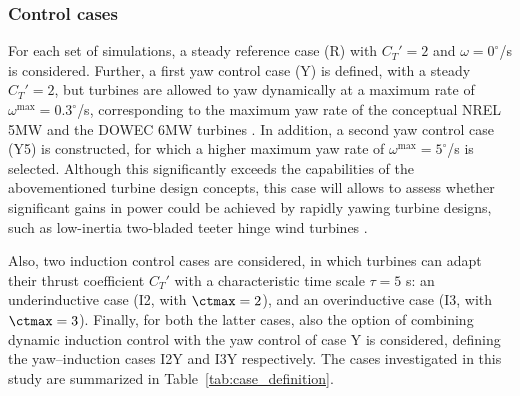 \subsubsection{Control cases}

For each set of simulations, a steady reference case (R) with $C_T' = 2$ and $\omega = 0^\circ$/s is considered. Further, a first yaw control case (Y) is defined, with a steady $C_T'=2$, but turbines are allowed to yaw dynamically at a maximum rate of $\omega^{\text{max}} = 0.3^\circ$/s, corresponding to the maximum yaw rate of the conceptual NREL 5MW and the DOWEC 6MW turbines \citep{jonkman2009definition, kooijman2003dowec}. In addition, a second yaw control case (Y5) is constructed, for which a higher maximum yaw rate of $\omega^{\text{max}} = 5^\circ$/s is selected. Although this significantly exceeds the capabilities of the abovementioned turbine design concepts, this case will allows to assess whether significant gains in power could be achieved by rapidly yawing turbine designs, such as low-inertia two-bladed teeter hinge wind turbines \citep{kim2014yaw}. 

Also, two induction control cases are considered, in which turbines can adapt their thrust coefficient $C_T'$ with a characteristic time scale $\tau = 5$ s: an underinductive case (I2, with $\ctmax = 2$), and an overinductive case (I3, with $\ctmax = 3$). Finally, for both the latter cases, also the option of combining dynamic induction control with the yaw control of case Y is considered, defining the yaw--induction cases I2Y and I3Y respectively. The cases investigated in this study are summarized in Table~\ref{tab:case_definition}. 

